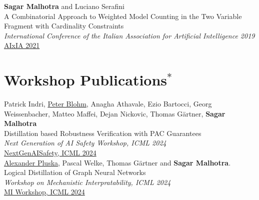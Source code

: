 \documentclass[10pt, a4paper]{article}
\newcommand{\years}[1]{\marginnote{\scriptsize #1}}
\begin{document}
\years{2021}\textbf{Sagar Malhotra} and Luciano Serafini\\
 A Combinatorial Approach to Weighted Model Counting in the Two Variable Fragment with Cardinality Constraints\\ \emph{International Conference of the Italian Association for Artificial Intelligence 2019}\\
\href{https://link.springer.com/chapter/10.1007/978-3-031-08421-8_10}{AIxIA 2021}


\section*{Workshop Publications$^{*}$}
\years{2024} Patrick Indri, \underline{Peter Blohm}, Anagha Athavale, Ezio Bartocci, Georg Weissenbacher, Matteo Maffei, Dejan Nickovic, Thomas Gärtner, \textbf{Sagar Malhotra}\\
Distillation based Robustness Verification with PAC Guarantees\\
\emph{Next Generation of AI Safety Workshop, ICML 2024}\\
\href{https://openreview.net/forum?id=vflefS3lmB}{NextGenAISafety, ICML 2024}\\

\years{2024}\underline{Alexander Pluska}, Pascal Welke, Thomas G{\"a}rtner and \textbf{Sagar Malhotra}.\\
Logical Distillation of Graph Neural Networks\\
\emph{Workshop on Mechanistic Interpratability, ICML 2024}\\
\href{https://openreview.net/forum?id=TfYnD2gYRO}{MI Workshop, ICML 2024}\\ \\
\end{document}
